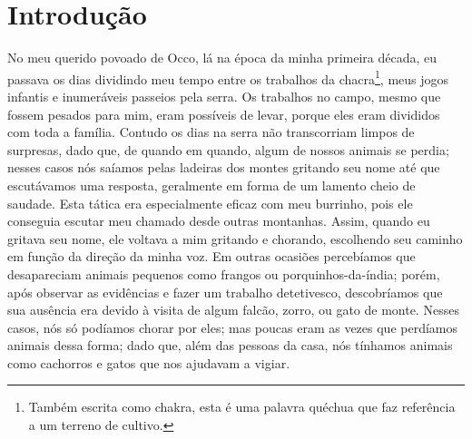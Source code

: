 \cleardoublepage
\newpage
{}
\chapter*{Introdução} %

No meu querido povoado de Occo, lá na época da minha primeira década, eu passava os dias dividindo meu tempo entre os trabalhos da chacra\footnote{Também escrita como chakra, esta é uma palavra quéchua que faz referência a um terreno de cultivo.}, meus jogos infantis e inumeráveis passeios pela serra.
Os trabalhos no campo, mesmo que fossem pesados para mim, eram possíveis de levar, porque eles eram divididos com toda a família.
Contudo os dias na serra não transcorriam limpos de surpresas, dado que, de quando em quando, algum de nossos animais se perdia; nesses casos nós saíamos pelas ladeiras dos montes gritando seu nome até que escutávamos uma resposta, geralmente em forma de um lamento cheio de saudade.
Esta tática era especialmente eficaz com meu burrinho, pois ele conseguia escutar meu chamado desde outras montanhas. Assim, quando eu gritava seu nome, ele voltava a mim gritando e chorando, escolhendo seu caminho em função da direção da minha voz.
Em outras ocasiões percebíamos que desapareciam animais pequenos como frangos ou porquinhos-da-índia; porém, após observar as evidências e fazer um trabalho detetivesco, descobríamos que sua ausência era devido à visita de algum falcão, zorro, ou gato de monte.
Nesses casos, nós só podíamos chorar por eles; mas poucas eram as vezes que perdíamos animais dessa forma; dado que, além das pessoas da casa, nós tínhamos animais como cachorros e gatos que nos ajudavam a vigiar.

